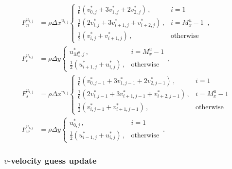 \documentclass{article}
\begin{document}
\begin{subequations}
	\begin{align}
	F_n^{u_{i,j}} & = \rho \Delta x^{u_{i,j}} \begin{cases}
	\frac{1}{6} \left(v^*_{0, j} + 3 v^*_{1, j} + 2 v^*_{2, j} \right)\,, & i = 1 \\
	\frac{1}{6} \left(2 v^*_{i, j} + 3 v^*_{i + 1, j} + v^*_{i + 2, j} \right)\,, & i = M_x^u - 1 \\
	\frac{1}{2} \left(v^*_{i, j} + v^*_{i + 1, j}\right)\,, & \text{otherwise} 
	\end{cases}\,, \\
	F_e^{u_{i,j}} & = \rho \Delta y \begin{cases}
	u^*_{M_x^u, j}\,, & i = M_x^u - 1 \\
	\frac{1}{2} \left(u^*_{i+1, j} + u^*_{i,j}\right)\,, & \text{otherwise}
	\end{cases}\,, \\
	F_s^{u_{i,j}} & = \rho \Delta x^{u_{i,j}} \begin{cases}
	\frac{1}{6} \left(v^*_{0, j - 1} + 3 v^*_{1, j - 1} + 2 v^*_{2, j - 1} \right)\,, & i = 1 \\
	\frac{1}{6} \left(2 v^*_{i, j - 1} + 3 v^*_{i + 1, j - 1} + v^*_{i + 2, j - 1} \right)\,, & i = M_x^u - 1 \\
	\frac{1}{2} \left(v^*_{i, j - 1} + v^*_{i + 1, j - 1}\right)\,, & \text{otherwise} 
	\end{cases} \\
	F_w^{u_{i,j}} & = \rho \Delta y \begin{cases}
	u^*_{0, j}\,, & i = 1 \\
	\frac{1}{2} \left( u^*_{i - 1, j} + u^*_{i, j} \right)\,, & \text{otherwise}
	\end{cases}\,.
	\end{align}
\end{subequations}

\subsubsection{$v$-velocity guess update}
\end{document}
